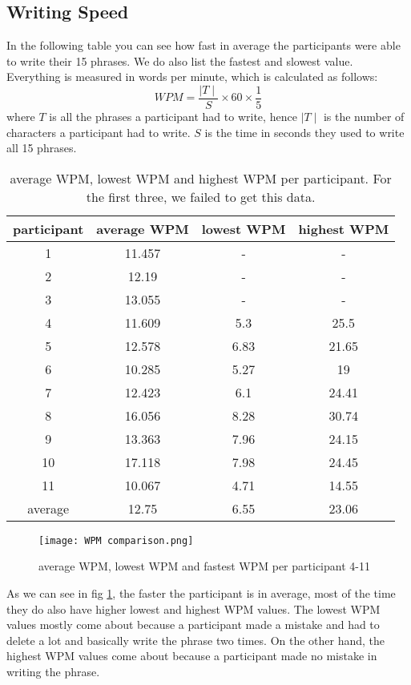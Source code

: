 \subsection{Writing Speed}
In the following table you can see how fast in average the participants were able to write their 15 phrases. We do also list the fastest and slowest value. Everything is measured in words per minute, which is calculated as follows:
\begin{equation}
    WPM = \frac{\mid T \mid}{S} \times 60 \times \frac{1}{5}
\end{equation}
where $T$ is all the phrases a participant had to write, hence $\mid T \mid$ is the number of characters a participant had to write. $S$ is the time in seconds they used to write all 15 phrases.\\
\begin{table}[ht!]
    \centering
    \begin{tabular}{cccc} \toprule
        participant&average WPM&lowest WPM&highest WPM\\ \midrule
        1 & 11.457 & - & -\\ 
        2 & 12.19 & - & -\\
        3 & 13.055 & - & -\\ 
        4 & 11.609 & 5.3 & 25.5\\
        5 & 12.578 & 6.83 & 21.65\\
        6 & 10.285 & 5.27 & 19\\
        7 & 12.423 & 6.1 & 24.41\\
        8 & 16.056 & 8.28 & 30.74\\
        9 & 13.363 & 7.96 & 24.15\\
        10 & 17.118 & 7.98 & 24.45\\
        11 & 10.067 & 4.71 & 14.55\\
        \bottomrule
        average&12.75&6.55&23.06\\
        \bottomrule
    \end{tabular}
    \caption{average WPM, lowest WPM and highest WPM per participant. For the first three, we failed to get this data.}
    \label{tab:WPM}
\end{table}
\clearpage

\begin{figure}
    \centering
    \texttt{[image: WPM comparison.png]}
    \caption{average WPM, lowest WPM and fastest WPM per participant 4-11}
    \label{fig:WPM}
\end{figure}
As we can see in fig \ref{fig:WPM}, the faster the participant is in average, most of the time they do also have higher lowest and highest WPM values. The lowest WPM values mostly come about because a participant made a mistake and had to delete a lot and basically write the phrase two times. On the other hand, the highest WPM values come about because a participant made no mistake in writing the phrase. \\

